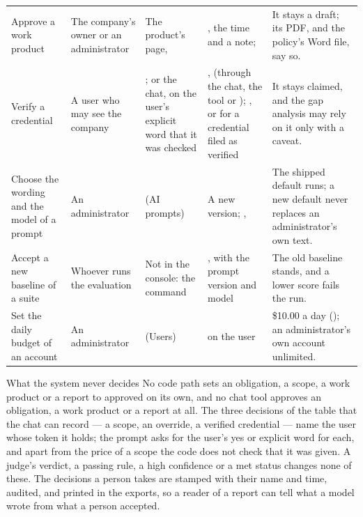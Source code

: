 \begin{xltabular}{\textwidth}{@{}L{25mm}L{18mm}L{24mm}YL{31mm}@{}}
Approve a work product & The company's owner or an administrator & The product's page,  & , the time and a note;  & It stays a draft; its PDF, and the policy's Word file, say so. \\
Verify a credential & A user who may see the company & ; or the chat, on the user's explicit word that it was checked & ,  (through the chat, the tool  or ); , or  for a credential filed as verified & It stays claimed, and the gap analysis may rely on it only with a caveat. \\
Choose the wording and the model of a prompt & An administrator &  (AI prompts) & A new version; ,  & The shipped default runs; a new default never replaces an administrator's own text. \\
Accept a new baseline of a suite & Whoever runs the evaluation & Not in the console: the command  & , with the prompt version and model & The old baseline stands, and a lower score fails the run. \\
Set the daily budget of an account & An administrator &  (Users) &  on the user & \$10.00 a day (); an administrator's own account unlimited. \\
\end{xltabular}

\begin{humanbox}{What the system never decides}
No code path sets an obligation, a scope, a work product or a report to approved on its own,
and no chat tool approves an obligation, a work product or a report at all. The three decisions
of the table that the chat can record --- a scope, an override, a verified credential --- name
the user whose token it holds; the prompt asks for the user's yes or explicit word for each,
and apart from the price of
a scope the code does not check that it was given.
A judge's verdict, a passing rule, a high confidence or a met status changes none of these.
The decisions a person takes are stamped with their name and time, audited, and printed in
the exports, so a reader of a report can tell what a model wrote from what a person accepted.
\end{humanbox}

